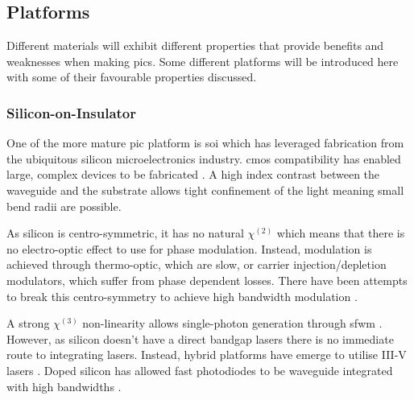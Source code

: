 

\subsection{Platforms}

Different materials will exhibit different properties that provide benefits and weaknesses when making \acp{pic}. Some different platforms will be introduced here with some of their favourable properties discussed.

\subsubsection*{Silicon-on-Insulator}

One of the more mature \ac{pic} platform is \ac{soi} which has leveraged fabrication from the ubiquitous silicon microelectronics industry. \Ac{cmos} compatibility has enabled large, complex devices to be fabricated \cite{wang2019integrated}. A high index contrast between the waveguide and the substrate allows tight confinement of the light meaning small bend radii are possible. 

As silicon is centro-symmetric, it has no natural $\chi^{(2)}$ which means that there is no electro-optic effect to use for phase modulation. Instead, modulation is achieved through thermo-optic, which are slow, or carrier injection/depletion modulators, which suffer from phase dependent losses. There have been attempts to break this centro-symmetry to achieve high bandwidth modulation \cite{cazzanelli2016second, castellan2019origin}.

A strong $\chi^{(3)}$ non-linearity allows single-photon generation through \ac{sfwm} \cite{SilverstoneThesis}. However, as silicon doesn't have a direct bandgap lasers there is no immediate route to integrating lasers. Instead, hybrid platforms have emerge to utilise III-V lasers \cite{Fan2017, Agnesi2019}. Doped silicon has allowed fast photodiodes to be waveguide integrated with high bandwidths \cite{raffaelli2018generation}.

